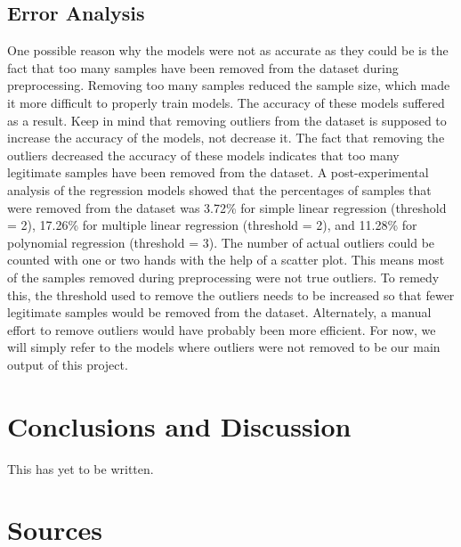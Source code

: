 \documentclass[a4paper]{article}
\begin{document}
	\subsection{Error Analysis}
	
	One possible reason why the models were not as accurate as they could be is the fact that too many samples have been removed from the dataset during preprocessing. Removing too many samples reduced the sample size, which made it more difficult to properly train models. The accuracy of these models suffered as a result. Keep in mind that removing outliers from the dataset is supposed to increase the accuracy of the models, not decrease it. The fact that removing the outliers decreased the accuracy of these models indicates that too many legitimate samples have been removed from the dataset. A post-experimental analysis of the regression models showed that the percentages of samples that were removed from the dataset was 3.72\% for simple linear regression (threshold = 2), 17.26\% for multiple linear regression (threshold = 2), and 11.28\% for polynomial regression (threshold = 3). The number of actual outliers could be counted with one or two hands with the help of a scatter plot. This means most of the samples removed during preprocessing were not true outliers. To remedy this, the threshold used to remove the outliers needs to be increased so that fewer legitimate samples would be removed from the dataset. Alternately, a manual effort to remove outliers would have probably been more efficient. For now, we will simply refer to the models where outliers were not removed to be our main output of this project. 
	
	\section{Conclusions and Discussion}
	
	This has yet to be written.
	
	\section{Sources}
	
	
		
\end{document}
